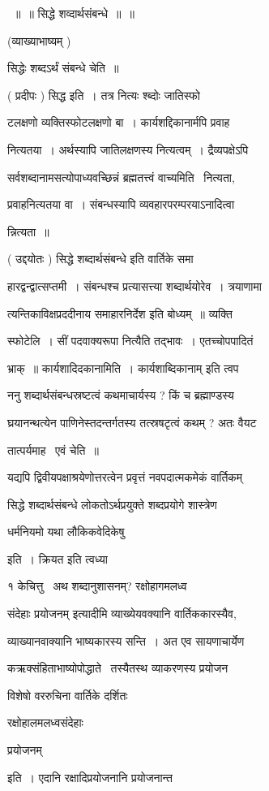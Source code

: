 \documentclass[11pt, openany]{book}
\begin{document}
~॥~॥ सिद्धे शव्दार्थसंबन्धे~॥~॥ 

(व्याख्याभाष्यम् ) 

सिद्धेः शब्दऽर्थं संबन्धे चेति~॥ 

( प्रदीपः ) सिद्ध इति~। तत्र नित्यः श्ब्दोः जातिस्फो \textendash\ 

टलक्षणो व्यक्तिस्फोटलक्षणो बा~। कार्यशद्दिकानार्मपि प्रवाह \textendash\ 

नित्यतया~। अर्थस्यापि जातिलक्षणस्य नित्यत्वम्~। द्रैव्यपक्षेऽपि 

सर्वशब्दानामसत्योपाध्यवच्छिन्नं ब्रह्मतत्त्वं वाच्यमिति \textendash\ नित्यता, 

प्रवाहनित्यतया वा~। संबन्धस्यापि व्यवहारपरम्परयाऽनादित्वा \textendash\ 

न्नित्यता~॥ 

( उद्दयोतः ) {\qt सिद्धे शब्दार्थसंबन्धे} इति वार्तिके समा \textendash\ 

हारद्वन्द्वात्सप्तमी~। संबन्धश्च प्रत्यासत्त्या शब्दार्थयोरेव~। 
त्रयाणामा \textendash\ 

त्यन्तिकाविक्षप्रददीनाय समाहारनिर्देश इति बोध्यम्~॥ व्यक्ति \textendash\ 

स्फोटेलि~। सीं पदवाक्यरूपा नित्यैति तद्भावः~। एतच्चोपपादितं 

भ्राक्~॥ कार्यशादिदकानामिति~। {\qt कार्यशाब्दिकानाम् इति त्वप} \textendash\ 



ननु शब्दार्थसंबन्धस्रष्टत्वं कथमाचार्यस्य ? किं च ब्रह्माण्डस्य 

घ्रयानन्थत्येन पाणिनेस्तदन्तर्गतस्य तत्स्रषटृत्वं कथम् ? अतः वैयट \textendash\ 

तात्पर्यमाह \textendash\ एवं चेति~॥ 

यद्यपि द्विवीयपक्षाश्रयेणोत्तरत्वेन प्रवृत्तं नवपदात्मकमेकं वार्तिकम् 

{\qt सिद्धे शब्दार्थसंबन्धे लोकतोऽर्थप्रयुक्ते शब्दप्रयोगे शास्त्रेण 

धर्मनियमो यथा लौकिकवेदिकेषु} इति~। क्रियत इति त्वध्या \textendash\ 

१ केचित्तु \textendash\ {\qt अथ शब्दानुशासनम्}? रक्षोहागमलध्व \textendash\ 

संदेहाः प्रयोजनम् इत्यादीमि व्याख्येयवक्यानि वार्तिककारस्यैव, 

व्याख्यानवाक्यानि भाष्यकारस्य सन्ति~। अत एव सायणाचार्येण 

कऋक्संहिताभाष्योपोद्धाते \textendash\ तस्यैतस्थ व्याकरणस्य प्रयोजन \textendash\ 

विशेषो वररुचिना वार्तिके दर्शितः \textendash\ {\qt रक्षोहालमलध्वसंदेहाः 

प्रयोजनम्} इति~। एदानि रक्षादिप्रयोजनानि प्रयोजनान्त \textendash\ 
\end{document}
